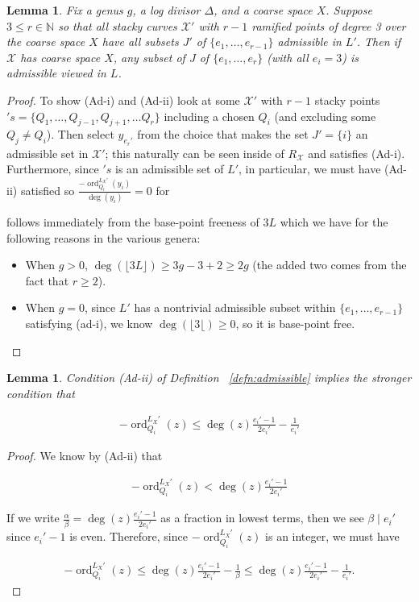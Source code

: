 \documentclass{amsart}
\theoremstyle{plain}
\newtheorem{lem}[thm]{Lemma}
\theoremstyle{definition}
\theoremstyle{remark}
\numberwithin{equation}{section}
\newcommand\BN{{\mathbb N}}
\newcommand \sx{\mathscr X}
\DeclareMathOperator{\ord}{ord}
\newcommand \subhalf[1]{\frac{{#1} - 1}{2{#1}}}
\newcommand \halfcan{L}
\begin{document}
\begin{lem}\label{lem:n-3s-admissible}
Fix a genus $g$, a log divisor $\Delta$, and a coarse space $X$. Suppose $3\le r\in \BN$ so that all stacky curves $\sx'$ with $r- 1$ ramified points of degree 3 over the coarse space $X$ have all subsets $J'$ of $\{e_1, \ldots, e_{r- 1}\}$ admissible in $L'$. Then if $\sx$ has coarse space $X$, any subset of $J$ of $\{e_1, \ldots, e_r\}$ (with all $e_i =3$) is admissible viewed in $L$.
\end{lem}
\begin{proof}
To show (Ad-i) and (Ad-ii) look at some $\sx'$ with $r- 1$ stacky points $'s=\{Q_1, \ldots, Q_{j - 1}, Q_{j + 1}, \ldots Q_r\}$ including a chosen $Q_i$ (and excluding some $Q_j\ne Q_i$). Then select $y_{e_r'}$ from the choice that makes the set $J'=\{i\}$ an admissible set in $\sx'$; this naturally can be seen inside of $R_{\sx}$ and satisfies (Ad-i). Furthermore, since $'s$ is an admissible set of $L'$, in particular, we must have (Ad-ii) satisfied so $\frac{-\ord_{Q_l}
^{\halfcan_X'}(y_i)}{\deg (y_i)} = 0$ for

 follows immediately from the base-point freeness of $3\halfcan$ which we have for the following reasons in the various genera:
\begin{itemize}
\item When $g> 0$, $\deg(\lfloor 3 L\rfloor)\ge 3g-3+2\ge 2g$ (the added two comes from the fact that $r\ge 2$).
\item When $g= 0$, since $L'$ has a nontrivial admissible subset within $\{e_1, \ldots, e_{r- 1}\}$ satisfying (ad-i), we know $\deg(\lfloor 3\lfloor)\ge 0$, so it is base-point free.
\end{itemize}
\end{proof}


\begin{lem}
\label{lem:admissible_inequality}
Condition (Ad-ii) of Definition ~\ref{defn:admissible} implies the
stronger condition that

\begin{align*}
	-\ord_{Q_i}
^{\halfcan_X'}(z) \leq \deg(z) \subhalf{e_i'} -\frac{1}{e_i'}
\end{align*}
\end{lem}

\begin{proof}
We know by (Ad-ii) that

\begin{align*}
	-\ord_{Q_i}
^{\halfcan_X'}(z) < \deg(z) \subhalf{e_i'}
\end{align*}

\noindent
If we write $\frac{\alpha}{\beta} = \deg(z) \frac{e_i'- 1}{2e_i'}$ 
as a fraction in lowest terms, then we see $\beta \mid e_i'$ since $
e_i'- 1$ is even. Therefore, since $-\ord_{Q_i}
^{\halfcan_X'}(z)$ is an integer, 
we must have

\begin{align*}
	-\ord_{Q_i}
^{\halfcan_X'}(z) \leq \deg(z) \subhalf{e_i'} - \frac{1}{\beta} \leq 
	\deg(z) \subhalf{e_i'} - \frac{1}{e_i'}.
\end{align*}
\end{proof}
\end{document}
